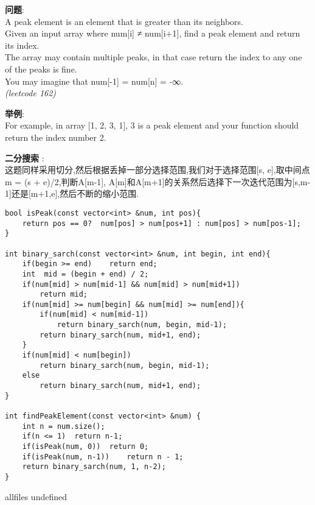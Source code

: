 \documentclass{article}
\begin{document}
\begin{CJK}{UTF8}{gbsn}     %

\else
    
\begin{description}
    \item{\textbf{问题}}: \\
A peak element is an element that is greater than its neighbors.\\
Given an input array where num[i] ≠ num[i+1], find a peak element and return its index.\\
The array may contain multiple peaks, in that case return the index to any one of the peaks is fine.\\
You may imagine that num[-1] = num[n] = -∞.\\
\textit{(leetcode 162)}
	\item{\textbf{举例}}:\\
For example, in array [1, 2, 3, 1], 3 is a peak element and your function should return the index number 2.
    \item{\textbf{二分搜索}} : 
    \\这题同样采用切分,然后根据丢掉一部分选择范围,我们对于选择范围[s, e],取中间点m = (s + e)/2,判断A[m-1], A[m]和A[m+1]的关系然后选择下一次迭代范围为[s,m-1]还是[m+1,e],然后不断的缩小范围. 
    \begin{lstlisting}
bool isPeak(const vector<int> &num, int pos){
	return pos == 0?  num[pos] > num[pos+1] : num[pos] > num[pos-1];
}

int binary_sarch(const vector<int> &num, int begin, int end){
	if(begin >= end)	return end;
	int  mid = (begin + end) / 2;
	if(num[mid] > num[mid-1] && num[mid] > num[mid+1])
		return mid;
	if(num[mid] >= num[begin] && num[mid] >= num[end]){
		if(num[mid] < num[mid-1])
			return binary_sarch(num, begin, mid-1);
		return binary_sarch(num, mid+1, end);
	}
	if(num[mid] < num[begin])
		return binary_sarch(num, begin, mid-1);
	else
		return binary_sarch(num, mid+1, end);
}

int findPeakElement(const vector<int> &num) {
	int n = num.size();
	if(n <= 1)	return n-1;	
	if(isPeak(num, 0))	return 0;
	if(isPeak(num, n-1))	return n - 1;
	return binary_sarch(num, 1, n-2);
}
    \end{lstlisting}
    \textit{}
\end{description}

\fi

\ifx allfiles undefined
\end{CJK}
\end{document}
